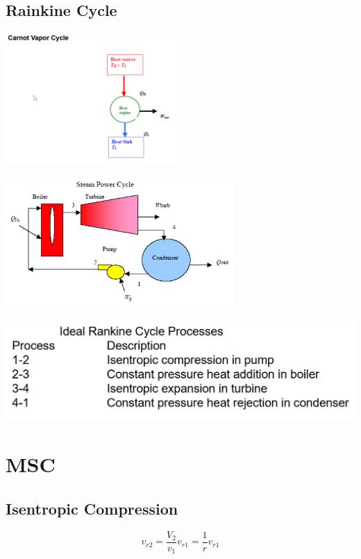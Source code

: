 \documentclass[10pt,landscape]{article}
\newenvironment{Figure}
     {\par\medskip\noindent\minipage{\linewidth}}
     {\endminipage\par\medskip}
\begin{document}
\begin{multicols}{3}
\subsection{Rainkine Cycle}
\begin{Figure}
    \centering
    \includegraphics[width=\linewidth, height=5cm]{Carnot_VaporCycle.png}
\end{Figure}
\begin{Figure}
    \centering
    \includegraphics[width=\linewidth, height=5cm]{SteamPowerCycle.png}
\end{Figure}
\begin{Figure}
    \centering
    \includegraphics[width=\linewidth]{RankineCycleProcess.png}
\end{Figure}

\section{MSC}
\subsection{Isentropic Compression}
\begin{equation}
    v_{r2}=\frac{V_2}{v_1}v_{r1}=\frac{1}{r}v_{r1}
\end{equation}

\end{multicols}
\end{document}
